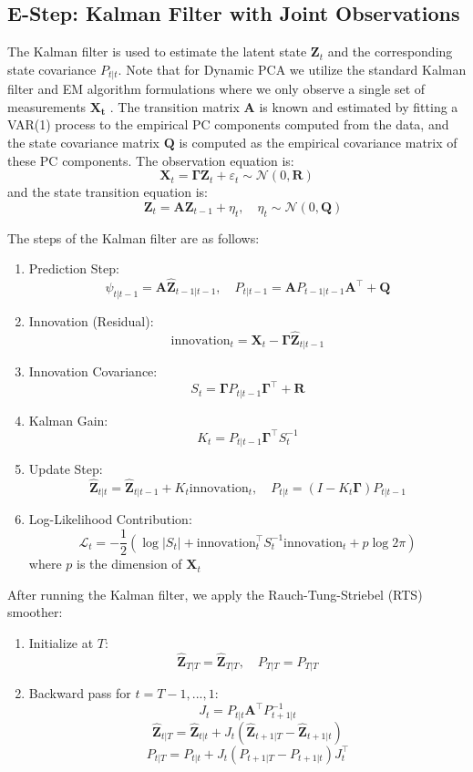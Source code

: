 \documentclass[11pt]{article}
\theoremstyle{plain}
\theoremstyle{definition}
\theoremstyle{remark}
\numberwithin{equation}{section}
\newcommand{\veps}{\varepsilon}
\begin{document}
\subsection{E-Step: Kalman Filter with Joint Observations}

The Kalman filter is used to estimate the latent state $\mathbf{Z}_t$ and the corresponding state covariance $P_{t|t}$. Note that for Dynamic PCA we utilize the standard Kalman filter and EM algorithm formulations where we only observe a single set of measurements $\mathbf{X_t}$ . The transition matrix $\mathbf{A}$ is known and estimated by fitting a VAR(1) process to the empirical PC components computed from the data, and the state covariance matrix $\mathbf{Q}$ is computed as the empirical covariance matrix of these PC components. The observation equation is:
\[\mathbf{X}_t = \mathbf{\Gamma} \mathbf{Z}_t + \veps_t \sim \mathcal{N}(0, \mathbf{R})\]
and the state transition equation is:
\[\quad \mathbf{Z}_t = \mathbf{A} \mathbf{Z}_{t-1} + \eta_t, \quad \eta_t \sim \mathcal{N}(0, \mathbf{Q})\]

The steps of the Kalman filter are as follows:
\begin{enumerate}
    \item Prediction Step:
    \[\hat{\psi}_{t|t-1} = \mathbf{A} \hat{\mathbf{Z}}_{t-1|t-1}, \quad P_{t|t-1} = \mathbf{A} P_{t-1|t-1} \mathbf{A}^\top + \mathbf{Q}\]
    \item Innovation (Residual):
    \[\text{innovation}_t = \mathbf{X}_t - \mathbf{\Gamma} \hat{\mathbf{Z}}_{t|t-1}\]

\item Innovation Covariance:
\[S_t = \mathbf{\Gamma} P_{t|t-1} \mathbf{\Gamma}^\top + \mathbf{R}\]
\item Kalman Gain:
\[K_t = P_{t|t-1} \mathbf{\Gamma}^\top S_t^{-1}\]
\item Update Step:
\[\hat{\mathbf{Z}}_{t|t} = \hat{\mathbf{Z}}_{t|t-1} + K_t \text{innovation}_t, \quad P_{t|t} = (I - K_t \mathbf{\Gamma}) P_{t|t-1}\]
\item Log-Likelihood Contribution:
\[\mathcal{L}_t = -\frac{1}{2} \left( \log |S_t| + \text{innovation}_t^\top S_t^{-1} \text{innovation}_t + p \log 2\pi \right)\]
where $p$ is the dimension of $\mathbf{X}_t$
\end{enumerate}


After running the Kalman filter, we apply the Rauch-Tung-Striebel (RTS) smoother:
\begin{enumerate}
    \item Initialize at \( T \):
    \[
    \hat{\mathbf{Z}}_{T|T} = \hat{\mathbf{Z}}_{T|T}, \quad P_{T|T} = P_{T|T}
    \]
    \item Backward pass for \( t = T-1, ..., 1 \):
    \[
    J_t = P_{t|t} \mathbf{A}^\top P_{t+1|t}^{-1}
    \]
    \[
    \hat{\mathbf{Z}}_{t|T} = \hat{\mathbf{Z}}_{t|t} + J_t \left( \hat{\mathbf{Z}}_{t+1|T} - \hat{\mathbf{Z}}_{t+1|t} \right)
    \]
    \[
    P_{t|T} = P_{t|t} + J_t (P_{t+1|T} - P_{t+1|t}) J_t^\top
    \]
\end{enumerate}
\end{document}
